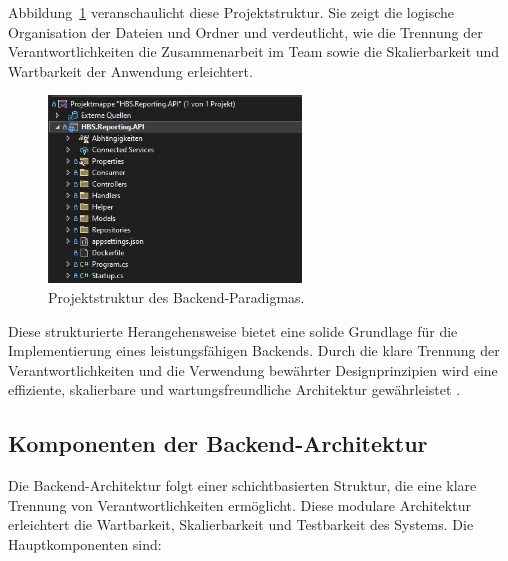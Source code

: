 Abbildung~\ref{fig:backend_code_paradigm} veranschaulicht diese Projektstruktur. Sie zeigt die logische Organisation der Dateien und Ordner und verdeutlicht, wie die Trennung der Verantwortlichkeiten die Zusammenarbeit im Team sowie die Skalierbarkeit und Wartbarkeit der Anwendung erleichtert.

\begin{figure}[H]
    \centering
    \includegraphics[width=0.6\textwidth, keepaspectratio]{images/backendparadigma.jpg}
    \caption{Projektstruktur des Backend-Paradigmas.}
    \label{fig:backend_code_paradigm}
\end{figure}

Diese strukturierte Herangehensweise bietet eine solide Grundlage für die Implementierung eines leistungsfähigen Backends. Durch die klare Trennung der Verantwortlichkeiten und die Verwendung bewährter Designprinzipien wird eine effiziente, skalierbare und wartungsfreundliche Architektur gewährleistet \cite{microsoftDotNetArchitecture}.




\subsection{Komponenten der Backend-Architektur}
Die Backend-Architektur folgt einer schichtbasierten Struktur, die eine klare Trennung von Verantwortlichkeiten ermöglicht. Diese modulare Architektur erleichtert die Wartbarkeit, Skalierbarkeit und Testbarkeit des Systems. Die Hauptkomponenten sind:

